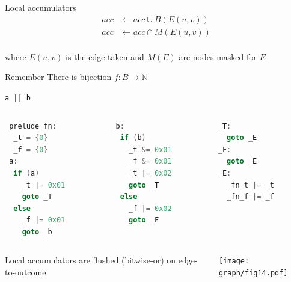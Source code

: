 \documentclass[xcolor = {dvipsnames, table}]{beamer}
\begin{document}
\begin{frame}
    \begin{block}{Local accumulators}
        \begin{align*}
            acc & \gets acc \cup B(E(u, v)) \\
            acc & \gets acc \cap M(E(u, v)) \\
        \end{align*}

        where $E(u, v)$ is the edge taken and $M(E)$ are nodes masked for $E$
    \end{block}

    \begin{block}{Remember}
        There is bijection $f: B \rightarrow \mathbb{N}$
    \end{block}
\end{frame}

\begin{frame}[fragile]
    \centering
    \lstinline{a || b}
    \begin{columns}
        \begin{column}{0.3\textwidth}
            \begin{lstlisting}[language=C, basicstyle=\small\ttfamily]
_prelude_fn:
  _t = {0}
  _f = {0}
_a:
  if (a)
    _t |= 0x01
    goto _T
  else
    _f |= 0x01
    goto _b
            \end{lstlisting}
        \end{column}

        \begin{column}{0.3\textwidth}
        \begin{lstlisting}[language=C, basicstyle=\small\ttfamily]
_b:
  if (b)
    _t &= 0x01
    _f &= 0x01
    _t |= 0x02
    goto _T
  else
    _f |= 0x02
    goto _F
        \end{lstlisting}
        \end{column}

        \begin{column}{0.3\textwidth}
            \begin{lstlisting}[language=C, basicstyle=\small\ttfamily]
_T:
  goto _E
_F:
  goto _E
_E:
  _fn_t |= _t
  _fn_f |= _f
        \end{lstlisting}
        \end{column}
    \end{columns}
\end{frame}

\begin{frame}
    \begin{columns}
        \begin{column}{0.5\textwidth}
            Local accumulators are flushed (bitwise-or) on edge-to-outcome
        \end{column}

        \begin{column}{0.5\textwidth}
            \texttt{[image: graph/fig14.pdf]}
        \end{column}
    \end{columns}
\end{frame}
\end{document}
